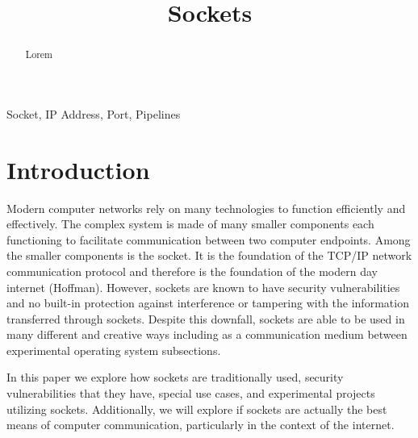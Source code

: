 \documentclass[conference, 12pt]{IEEEtran}
\begin{document}
\title{Sockets}

\author{
\and
{}
\and
{}
}

\maketitle

\begin{abstract}
Lorem
\end{abstract}

\begin{IEEEkeywords}
Socket, IP Address, Port, Pipelines
\end{IEEEkeywords}

\section{Introduction}
Modern computer networks rely on many technologies to function efficiently and effectively. The complex system is made of many smaller components each functioning to facilitate communication between two computer endpoints. Among the smaller components is the socket. It is the foundation of the TCP/IP network communication protocol and therefore is the foundation of the modern day internet (Hoffman). However, sockets are known to have security vulnerabilities and no built-in protection against interference or tampering with the information transferred through sockets. Despite this downfall, sockets are able to be used in many different and creative ways including as a communication medium between experimental operating system subsections.

In this paper we explore how sockets are traditionally used, security vulnerabilities that they have, special use cases, and experimental projects utilizing sockets. Additionally, we will explore if sockets are actually the best means of computer communication, particularly in the context of the internet.
\end{document}
